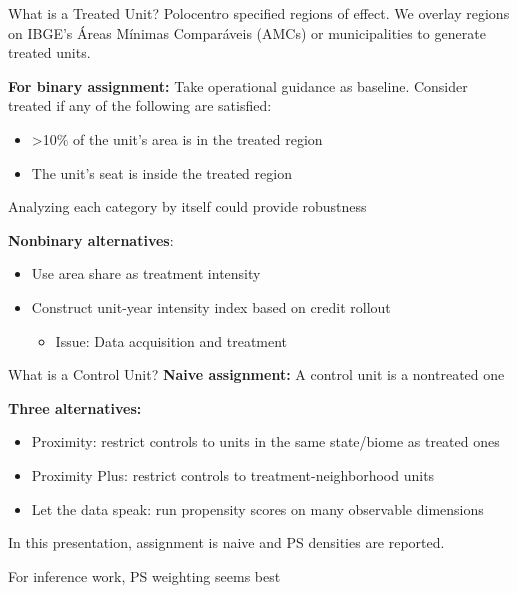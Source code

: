 \documentclass[aspectratio=169]{beamer}
\begin{document}
\begin{frame}{What is a Treated Unit?}
Polocentro specified regions of effect. We overlay regions on IBGE's Áreas Mínimas Comparáveis (AMCs) or municipalities to generate treated units.
\vspace{0.5em}

\textbf{For binary assignment:} Take operational guidance as baseline. Consider treated if any of the following are satisfied:
\begin{itemize}
    \item >10\% of the unit's area is in the treated region
    \item The unit's seat is inside the treated region
\end{itemize}
Analyzing each category by itself could provide robustness

\textbf{Nonbinary alternatives}:
\begin{itemize}
    \item Use area share as treatment intensity    
    \item Construct unit-year intensity index based on credit rollout
    \begin{itemize}
        \item Issue: Data acquisition and treatment 
    \end{itemize}
\end{itemize}
\end{frame}



\begin{frame}{What is a Control Unit?}
\textbf{Naive assignment:} A control unit is a nontreated one
\vspace{1em}

\textbf{Three alternatives:}
\begin{itemize}
    \item Proximity: restrict controls to units in the same state/biome as treated ones
    \item Proximity Plus: restrict controls to treatment-neighborhood units
    \item Let the data speak: run propensity scores on many observable dimensions
\end{itemize}
\vspace{1em}

In this presentation, assignment is naive and PS densities are reported.

For inference work, PS weighting seems best

\end{frame}
\end{document}
